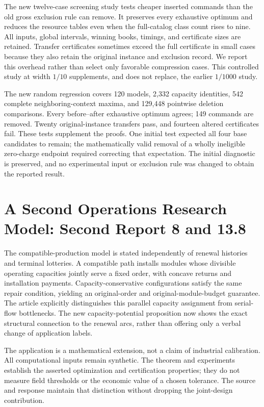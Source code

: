 The new twelve-case screening study tests cheaper inserted commands than the old gross exclusion rule can remove. It preserves every exhaustive optimum and reduces the resource tables even when the full-catalog class count rises to nine. All inputs, global intervals, winning books, timings, and certificate sizes are retained. Transfer certificates sometimes exceed the full certificate in small cases because they also retain the original instance and exclusion record. We report this overhead rather than select only favorable compression cases. This controlled study at width $1/10$ supplements, and does not replace, the earlier $1/1000$ study.

The new random regression covers 120 models, 2,332 capacity identities, 542 complete neighboring-context maxima, and 129,448 pointwise deletion comparisons. Every before--after exhaustive optimum agrees; 149 commands are removed. Twenty original-instance transfers pass, and fourteen altered certificates fail. These tests supplement the proofs. One initial test expected all four base candidates to remain; the mathematically valid removal of a wholly ineligible zero-charge endpoint required correcting that expectation. The initial diagnostic is preserved, and no experimental input or exclusion rule was changed to obtain the reported result.

\section{A Second Operations Research Model: Second Report 8 and 13.8}
The compatible-production model is stated independently of renewal histories and terminal lotteries. A compatible path installs modules whose divisible operating capacities jointly serve a fixed order, with concave returns and installation payments. Capacity-conservative configurations satisfy the same repair condition, yielding an original-order and original-module-budget guarantee. The article explicitly distinguishes this parallel capacity assignment from serial-flow bottlenecks. The new capacity-potential proposition now shows the exact structural connection to the renewal arcs, rather than offering only a verbal change of application labels.

The application is a mathematical extension, not a claim of industrial calibration. All computational inputs remain synthetic. The theorem and experiments establish the asserted optimization and certification properties; they do not measure field thresholds or the economic value of a chosen tolerance. The source and response maintain that distinction without dropping the joint-design contribution.

